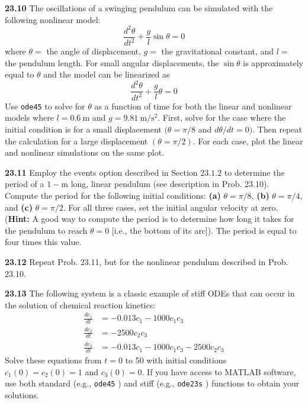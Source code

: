 \documentclass[../main.tex]{subfiles}
\begin{document}
\begin{multicols}{2}
    \noindent\textbf{23.10} The oscillations of a swinging pendulum can be simulated with the following nonlinear   model:
    $$
    \frac{d^{2} \theta}{d t^{2}}+\frac{g}{l} \sin \theta=0
    $$
    where $\theta=$ the angle of displacement, $g=$ the gravitational constant, and $l=$ the pendulum length. For   small angular displacements, the $\sin \theta$ is approximately equal to $\theta$ and the model can be    linearized as
    $$
    \frac{d^{2} \theta}{d t^{2}}+\frac{g}{l} \theta=0
    $$
    Use \texttt{ode45} to solve for $\theta$ as a function of time for both the linear and nonlinear models where   $l=0.6 \mathrm{~m}$ and $g=9.81 \mathrm{~m} / \mathrm{s}^{2}$. First, solve for the case where the initial    condition is for a small displacement $(\theta=\pi / 8$ and $d \theta / d t=0)$. Then repeat the calculation   for a large displacement $(\theta=\pi / 2)$. For each case, plot the linear and nonlinear simulations on the  same plot.\vspace{2mm}

    \noindent\textbf{23.11} Employ the events option described in Section $23.1 .2$ to determine the period of a    $1-\mathrm{m}$ long, linear pendulum (see description in Prob. 23.10). Compute the period for the following    initial conditions: \textbf{(a)} $\theta=\pi / 8$, \textbf{(b)} $\theta=\pi / 4$, and \textbf{(c)}     $\theta=\pi / 2$.
    For all three cases, set the initial angular velocity at zero. (\textbf{Hint:} A good way to compute the    period is to determine how long it takes for the pendulum to reach $\theta=0$ [i.e., the bottom of its arc]).  The period is equal to four times this value.\vspace{2mm}

    \noindent\textbf{23.12} Repeat Prob. 23.11, but for the nonlinear pendulum described in Prob. 23.10.\vspace {2mm}

    \noindent\textbf{23.13} The following system is a classic example of stiff ODEs that can occur in the   solution of chemical reaction kinetics:
    $$
    \begin{aligned}
    \frac{d c_{1}}{d t} &=-0.013 c_{1}-1000 c_{1} c_{3} \\
    \frac{d c_{2}}{d t} &=-2500 c_{2} c_{3} \\
    \frac{d c_{3}}{d t} &=-0.013 c_{1}-1000 c_{1} c_{3}-2500 c_{2} c_{3}
    \end{aligned}
    $$
    Solve these equations from $t=0$ to 50 with initial conditions $c_{1}(0)=c_{2}(0)=1$ and $c_{3}(0)=0$. If you   have access to MATLAB software, use both standard (e.g., \texttt{ode45} ) and stiff (e.g., \texttt{ode23s} )  functions to obtain your solutions.\vspace{2mm}


\end{multicols}
\end{document}
